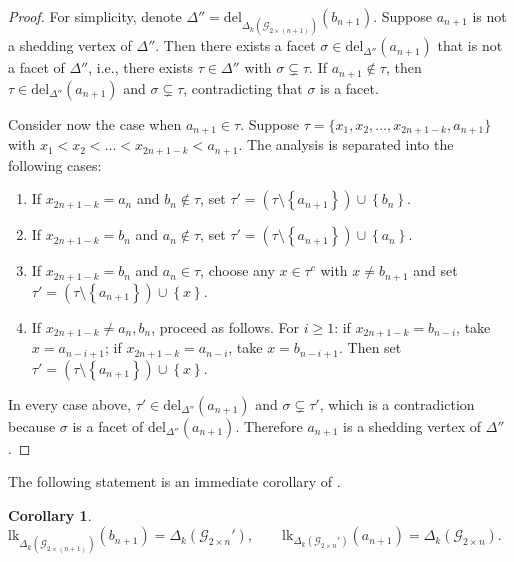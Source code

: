 \documentclass[11pt,reqno,a4paper]{amsart}
\theoremstyle{definition}
\theoremstyle{theorem}
\newtheorem{corollary}[theorem]{Corollary}
\newcommand{\kcut}{\Delta_{k}}
\newcommand{\twogg}{\mathcal{G}_{2\times n}}
\newcommand{\twoggn}{\mathcal{G}_{2\times \left(n+1\right)}}
\newcommand{\twoggp}{\mathcal{G}_{2\times n}'}
\newcommand{\lno}{\left(}
\newcommand{\rno}{\right)}
\newcommand{\lcu}{\left\{}
\newcommand{\rcu}{\right\}}
\newcommand{\lk}{\mathrm{lk}}
\newcommand{\del}{\mathrm{del}}
\theoremstyle{remark}
\begin{document}
	\begin{proof}
		For simplicity, denote $\Delta'' = \del_{\kcut\lno \twoggn \rno}\lno b_{n+1} \rno$. 
		Suppose $a_{n+1}$ is not a shedding vertex of $\Delta''$. Then there exists a facet $\sigma \in \del_{\Delta''}\lno a_{n+1} \rno$ that is not a facet of $\Delta''$, i.e., there exists $\tau \in \Delta''$ with $\sigma \subsetneq \tau$. If $a_{n+1} \notin \tau$, then $\tau \in \del_{\Delta''}\lno a_{n+1} \rno$ and $\sigma \subsetneq \tau$, contradicting that $\sigma$ is a facet.
		
		Consider now the case when $a_{n+1} \in \tau$. Suppose $\tau = \{x_1, x_2, \ldots, x_{2n+1-k}, a_{n+1}\}$ with $x_1 < x_2 < \dots < x_{2n+1-k} < a_{n+1}$. The analysis is separated into the following cases:
		
		\begin{enumerate}[label=\arabic*.]
			\item If $x_{2n+1-k} = a_n$ and $b_n \notin \tau$, set $\tau' = \lno \tau \setminus \lcu a_{n+1} \rcu \rno \cup \lcu b_n \rcu.$ 
						
			\item If $x_{2n+1-k} = b_n$ and $a_n \notin \tau$, set $\tau' = \lno \tau \setminus \lcu a_{n+1} \rcu \rno \cup \lcu a_n \rcu.$ 
					
			\item If $x_{2n+1-k} = b_n$ and $a_n \in \tau$, choose any 
			$x \in \tau^c$ with $x \neq b_{n+1}$ and set $\tau' = \lno \tau \setminus \lcu a_{n+1} \rcu \rno \cup \lcu x \rcu.$
			
			\item If $x_{2n+1-k} \neq a_n, b_n$, proceed as follows. 
			For $i \geq 1$:  
			if $x_{2n+1-k} = b_{n-i}$, take $x = a_{n-i+1}$; 
			if $x_{2n+1-k} = a_{n-i}$, take $x = b_{n-i+1}$. 
			Then set $\tau' = \lno \tau \setminus \lcu a_{n+1} \rcu \rno \cup \lcu x \rcu.$
		\end{enumerate}
		
		In every case above, $\tau' \in \del_{\Delta''}\lno a_{n+1} \rno$ and 
		$\sigma \subsetneq \tau'$, which is a contradiction because $\sigma$ is a facet of $\del_{\Delta''}\lno a_{n+1} \rno$. 
		Therefore $a_{n+1}$ is a shedding vertex of $\Delta''$.
	\end{proof}
	
	The following statement is an immediate corollary of .
	
	\begin{corollary}\label{lemma: link of a_n+1 in 2n'-gg in k-cut} $\lk_{\kcut\lno \twoggn\rno}\lno b_{n+1} \rno = \kcut\lno \twoggp \rno,
		\qquad
		\lk_{\kcut\lno \twoggp \rno}\lno a_{n+1} \rno = \kcut\lno \twogg \rno.$
	\end{corollary}
	
\end{document}
